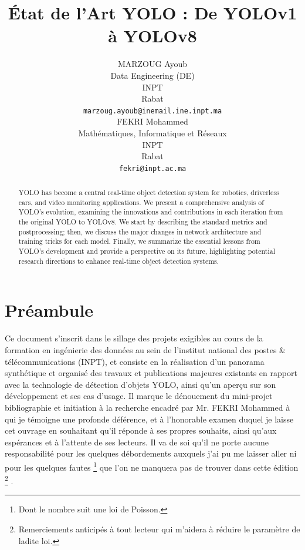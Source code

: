 \documentclass{article}
\title{État de l'Art YOLO : De YOLOv1 à YOLOv8
}
\author{
  MARZOUG Ayoub \\
  Data Engineering (DE) \\
  INPT \\
  Rabat\\
  \texttt{marzoug.ayoub@inemail.ine.inpt.ma} \\
   \And
  FEKRI Mohammed \\
  Mathématiques, Informatique et Réseaux \\
  INPT \\
  Rabat\\
  \texttt{fekri@inpt.ac.ma} \\
}
\newcommand{\cfootnote}[2][black]{%
    {\color{#1}\footnote{#2}}%
}
\begin{document}
\maketitle

\begin{center}
\end{center}

\vspace{1cm}

\begin{abstract}
\vspace{0.8cm}

YOLO has become a central real-time object detection system for robotics, driverless cars, and video monitoring applications. We present a comprehensive analysis of YOLO’s evolution, examining the innovations and contributions in each iteration from the original YOLO to YOLOv8. We start by describing the standard metrics and postprocessing; then, we discuss the major changes in network architecture and training tricks for each model. Finally, we summarize the essential lessons from YOLO’s development and provide a perspective on its future, highlighting potential research directions to enhance real-time object detection systems.
\end{abstract}

\vspace{0.5cm}


\vspace{0.5cm}

\section{Préambule}
Ce document s’inscrit dans le sillage des projets exigibles au cours de la formation en ingénierie des données au sein de l’institut national des postes \& télécommunications (INPT), et consiste en la réalisation d'un panorama synthétique et organisé des travaux et publications majeures existants en rapport avec la technologie de détection d'objets YOLO, ainsi qu'un aperçu sur son développement et ses cas d’usage. Il marque le dénouement du mini-projet bibliographie et initiation à la recherche encadré par Mr. FEKRI Mohammed à qui je témoigne une profonde déférence, et à l’honorable examen duquel je laisse cet ouvrage en souhaitant qu’il réponde à ses propres souhaits, ainsi qu’aux espérances et à l’attente de ses lecteurs. Il va de soi qu’il ne porte aucune responsabilité pour les quelques débordements auxquels j’ai pu me laisser aller ni pour les quelques fautes\cfootnote[black]{Dont le nombre suit une loi de Poisson.} que l’on ne manquera pas de trouver dans cette édition\cfootnote[black]{Remerciements anticipés à tout lecteur qui m’aidera à réduire le paramètre de ladite loi.}.
\end{document}
